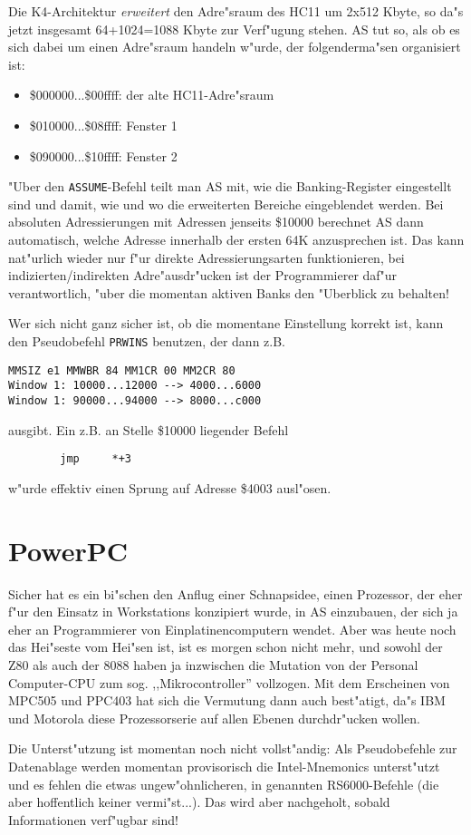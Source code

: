 \documentclass[12pt,a4paper,twoside]{report}
\begin{document}
{Die K4-Architektur {\em erweitert} den Adre"sraum des HC11 um 2x512 Kbyte,
so da"s jetzt insgesamt 64+1024=1088 Kbyte zur Verf"ugung stehen.  AS tut
so, als ob es sich dabei um einen Adre"sraum handeln w"urde, der
folgenderma"sen organisiert ist:
\begin{itemize}
\item{\$000000...\$00ffff: der alte HC11-Adre"sraum}
\item{\$010000...\$08ffff: Fenster 1}
\item{\$090000...\$10ffff: Fenster 2}
\end{itemize}
"Uber den {\tt ASSUME}-Befehl teilt man AS mit, wie die Banking-Register
eingestellt sind und damit, wie und wo die erweiterten Bereiche
eingeblendet werden.  Bei absoluten Adressierungen mit Adressen jenseits
\$10000 berechnet AS dann automatisch, welche Adresse innerhalb der ersten
64K anzusprechen ist.  Das kann nat"urlich wieder nur f"ur direkte
Adressierungsarten funktionieren, bei indizierten/indirekten
Adre"ausdr"ucken ist der Programmierer daf"ur verantwortlich, "uber die
momentan aktiven Banks den "Uberblick zu behalten!

Wer sich nicht ganz sicher ist, ob die momentane Einstellung korrekt ist,
kann den Pseudobefehl {\tt PRWINS} benutzen, der dann z.B.
\begin{verbatim}
MMSIZ e1 MMWBR 84 MM1CR 00 MM2CR 80
Window 1: 10000...12000 --> 4000...6000
Window 1: 90000...94000 --> 8000...c000
\end{verbatim}
ausgibt.  Ein z.B. an Stelle \$10000 liegender Befehl
\begin{verbatim}
        jmp     *+3
\end{verbatim}
w"urde effektiv einen Sprung auf Adresse \$4003 ausl"osen.


\section{PowerPC}

Sicher hat es ein bi"schen den Anflug einer Schnapsidee, einen Prozessor,
der eher f"ur den Einsatz in Workstations konzipiert wurde, in AS
einzubauen, der sich ja eher an Programmierer von Einplatinencomputern
wendet.  Aber was heute noch das Hei"seste vom Hei"sen ist, ist es morgen
schon nicht mehr, und sowohl der Z80 als auch der 8088 haben ja inzwischen
die Mutation von der Personal Computer-CPU zum sog. ,,Mikrocontroller''
vollzogen.  Mit dem Erscheinen von MPC505 und PPC403 hat sich die Vermutung
dann auch best"atigt, da"s IBM und Motorola diese Prozessorserie auf allen
Ebenen durchdr"ucken wollen.
\par
Die Unterst"utzung ist momentan noch nicht vollst"andig: Als Pseudobefehle
zur Datenablage werden momentan provisorisch die Intel-Mnemonics
unterst"utzt und es fehlen die etwas ungew"ohnlicheren, in \cite{Mot601}
genannten RS6000-Befehle (die aber hoffentlich keiner vermi"st...).  Das
wird aber nachgeholt, sobald Informationen verf"ugbar sind!

}
\end{document}
